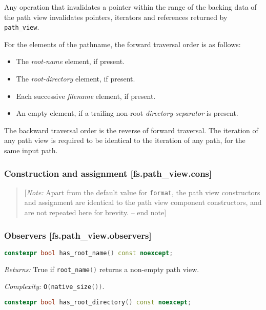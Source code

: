 \documentclass[11pt]{article}
\newcommand{\code}[2][cpp]{\lstinline[language=#1,basicstyle=\small\ttfamily]{#2}}
\newcommand{\desc}[1]{\textit{#1}}
\newcommand{\returns}{\desc{Returns: }}
\newcommand{\complexity}{\desc{Complexity: }}
\newcommand{\note}[1]{\begin{quote}[\textit{Note:} #1 -- end note]\end{quote}}
\begin{document}
Any operation that invalidates a pointer within the range of the backing data of the path view invalidates pointers, iterators and references returned by \code{path_view}.

For the elements of the pathname, the forward traversal order is as follows:

\begin{itemize}
    \item The \emph{root-name} element, if present.
    \item The \emph{root-directory} element, if present.
    \item Each successive \emph{filename} element, if present.
    \item An empty element, if a trailing non-root \emph{directory-separator} is present.
\end{itemize}
The backward traversal order is the reverse of forward traversal. The iteration of any path view is required to be identical to the iteration of any path, for the same input path.

\subsubsection*{Construction and assignment [fs.path\_view.cons]}

\color{black}

\note{Apart from the default value for \code{format}, the path view constructors and assignment are identical to the path view component constructors, and are not repeated here for brevity.}

\color{darkgreen}

\subsubsection*{Observers [fs.path\_view.observers]}

\begin{lstlisting}[language=cpp]
    constexpr bool has_root_name() const noexcept;
\end{lstlisting}

\returns True if \code{root_name()} returns a non-empty path view.

\complexity \code{O(native_size())}.\\

\begin{lstlisting}[language=cpp]
    constexpr bool has_root_directory() const noexcept;
\end{lstlisting}
\end{document}
